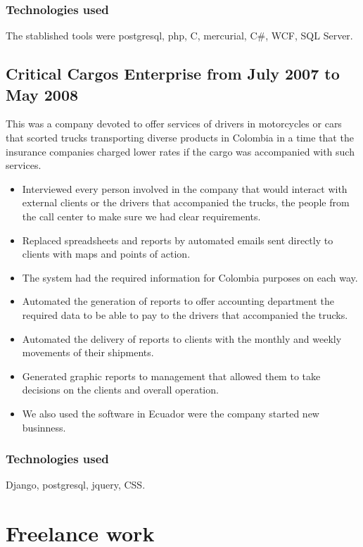 \documentclass{article}
\begin{document}
\subsubsection{Technologies used}
\label{sec:invytectools}

The stablished tools were postgresql, php, C, mercurial, C\#, WCF, SQL Server.

\subsection{Critical Cargos Enterprise from July 2007 to May 2008}
\label{sec:critical}

This was a company devoted to offer services of drivers in motorcycles or cars that scorted trucks transporting diverse products in Colombia in a time that the insurance companies charged lower rates if the cargo was accompanied with such services.

\begin{itemize}
\item Interviewed every person involved in the company that would interact with external clients or the drivers that accompanied the trucks, the people from the call center to make sure we had clear requirements.
\item Replaced spreadsheets and reports by automated emails sent directly to clients with maps and points of action.
\item The system had the required information for Colombia purposes on each way.
\item Automated the generation of reports to offer accounting department the required data to be able to pay to the drivers that accompanied the trucks.
\item Automated the delivery of reports to clients with the monthly and weekly movements of their shipments.
\item Generated graphic reports to management that allowed them to take decisions on the clients and overall operation.
\item We also used the software in Ecuador were the company started new businness.
\end{itemize}

\subsubsection{Technologies used}
\label{sec:criticaltools}
Django, postgresql, jquery, CSS.

\section{Freelance work}
\label{sec:freelance}
\end{document}
